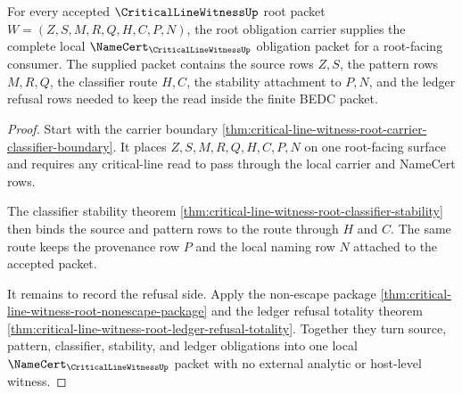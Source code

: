 \begin{theorem}
\label{thm:critical-line-witness-root-namecert-obligation-completion}
For every accepted $\CriticalLineWitnessUp$ root packet
$W=(Z,S,M,R,Q,H,C,P,N)$, the root obligation carrier supplies the complete
local $\NameCert_{\CriticalLineWitnessUp}$ obligation packet for a
root-facing consumer. The supplied packet contains the source rows $Z,S$, the
pattern rows $M,R,Q$, the classifier route $H,C$, the stability attachment to
$P,N$, and the ledger refusal rows needed to keep the read inside the finite
BEDC packet.
\end{theorem}
\begin{proof}
Start with the carrier boundary
\autoref{thm:critical-line-witness-root-carrier-classifier-boundary}. It
places $Z,S,M,R,Q,H,C,P,N$ on one root-facing surface and requires any
critical-line read to pass through the local carrier and NameCert rows.

The classifier stability theorem
\autoref{thm:critical-line-witness-root-classifier-stability} then binds the
source and pattern rows to the route through $H$ and $C$. The same route keeps
the provenance row $P$ and the local naming row $N$ attached to the accepted
packet.

It remains to record the refusal side. Apply the non-escape package
\autoref{thm:critical-line-witness-root-nonescape-package} and the ledger
refusal totality theorem
\autoref{thm:critical-line-witness-root-ledger-refusal-totality}. Together
they turn source, pattern, classifier, stability, and ledger obligations into
one local $\NameCert_{\CriticalLineWitnessUp}$ packet with no external
analytic or host-level witness.
\end{proof}

